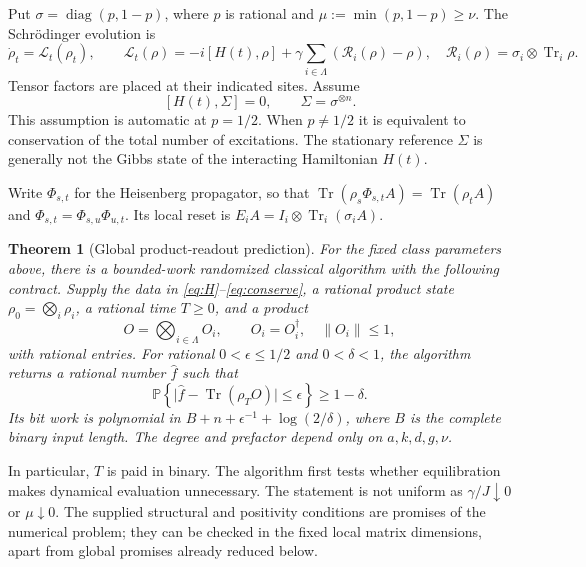 \documentclass[11pt,reqno]{amsart}
\numberwithin{equation}{section}
\newtheorem{theorem}{Theorem}[section]
\theoremstyle{definition}
\theoremstyle{remark}
\newcommand{\Tr}{\operatorname{Tr}}
\newcommand{\Prb}{\mathbb P}
\newcommand{\nn}[1]{\lVert#1\rVert}
\newcommand{\abs}[1]{\lvert#1\rvert}
\newcommand{\reset}{\mathcal R}
\newcommand{\cL}{\mathcal L}
\begin{document}
Put $\sigma=\operatorname{diag}(p,1-p)$, where $p$ is rational and
$\mu:=\min(p,1-p)\geq\nu$. The Schr\"odinger evolution is
\begin{equation}\label{eq:model}
 \dot\rho_t=\cL_t(\rho_t),\qquad
 \cL_t(\rho)=-i[H(t),\rho]+\gamma\sum_{i\in\Lambda}(\reset_i(\rho)-\rho),
 \quad \reset_i(\rho)=\sigma_i\otimes\Tr_i\rho.
\end{equation}
Tensor factors are placed at their indicated sites. Assume
\begin{equation}\label{eq:conserve}
 [H(t),\Sigma]=0,\qquad \Sigma=\sigma^{\otimes n}.
\end{equation}
This assumption is automatic at $p=1/2$. When $p\ne1/2$ it is equivalent to conservation of the total number of excitations. The stationary reference $\Sigma$ is generally not the Gibbs state of the interacting Hamiltonian $H(t)$.

Write $\Phi_{s,t}$ for the Heisenberg propagator, so that
$\Tr(\rho_s\Phi_{s,t}A)=\Tr(\rho_tA)$ and
$\Phi_{s,t}=\Phi_{s,u}\Phi_{u,t}$. Its local reset is
$E_iA=I_i\otimes\Tr_i(\sigma_i A)$.

\begin{theorem}[Global product-readout prediction]\label{thm:main}
For the fixed class parameters above, there is a bounded-work randomized classical algorithm with the following contract. Supply the data in \eqref{eq:H}--\eqref{eq:conserve}, a rational product state $\rho_0=\bigotimes_i\rho_i$, a rational time $T\geq0$, and a product
\[
 O=\bigotimes_{i\in\Lambda}O_i,\qquad O_i=O_i^\dagger,\quad\nn{O_i}\leq1,
\]
with rational entries. For rational $0<\epsilon\leq1/2$ and $0<\delta<1$, the algorithm returns a rational number $\widehat f$ such that
\begin{equation}\label{eq:guarantee}
 \Prb\!\left\{\abs{\widehat f-\Tr(\rho_T O)}\leq\epsilon\right\}\geq1-\delta.
\end{equation}
Its bit work is polynomial in $B+n+\epsilon^{-1}+\log(2/\delta)$, where $B$ is the complete binary input length. The degree and prefactor depend only on $a,k,d,g,\nu$.
\end{theorem}

In particular, $T$ is paid in binary. The algorithm first tests whether equilibration makes dynamical evaluation unnecessary. The statement is not uniform as $\gamma/J\downarrow0$ or $\mu\downarrow0$. The supplied structural and positivity conditions are promises of the numerical problem; they can be checked in the fixed local matrix dimensions, apart from global promises already reduced below.
\end{document}
